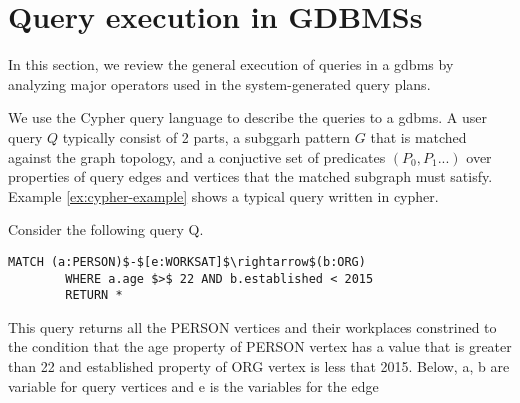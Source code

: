 \section{Query execution in GDBMSs}
\label{sec:operators}

In this section, we review the general execution of queries in a \gls{gdbms} by analyzing major operators used in the system-generated query plans.

We use the Cypher query language \cite{cypher} to describe the queries to a \gls{gdbms}.  A user query $Q$ typically consist of 2 parts, 
a subggarh pattern $G$ that is matched against the graph topology, and a conjuctive set of predicates $(P_0, P_1 ...)$ over properties of query edges and vertices that the matched subgraph must satisfy. Example \ref{ex:cypher-example} shows a typical query written in cypher.

\vspace{-4pt}
\begin{example}
	\label{ex:cypher-example}
	Consider the following query Q. 
	{\em 
		\begin{lstlisting}[numbers=none,  showstringspaces=false,belowskip=0pt ]
		MATCH (a:PERSON)$-$[e:WORKSAT]$\rightarrow$(b:ORG)
		WHERE a.age $>$ 22 AND b.established < 2015
		RETURN *\end{lstlisting}
	}
This query returns all the PERSON vertices and their workplaces constrined to the condition that the age property of PERSON vertex has a value that is greater than 22 and established property of ORG vertex is less that 2015. Below, a, b are variable for query vertices and e is the  variables for the edge
\end{example}
\vspace{-5pt}

